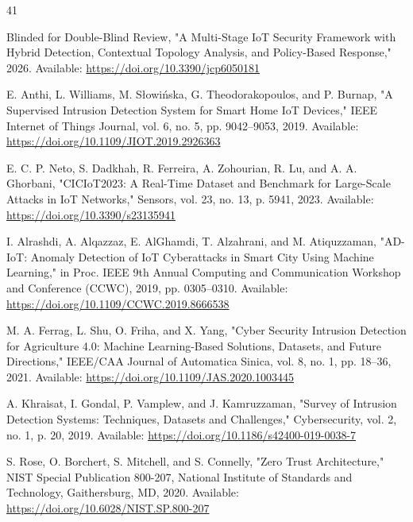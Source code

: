 \documentclass[journal,10pt,onecolumn]{IEEEtran}
\begin{document}
\appendix













\begin{thebibliography}{41}


 Blinded for Double-Blind Review, "A Multi-Stage IoT Security Framework with Hybrid Detection, Contextual Topology Analysis, and Policy-Based Response," 2026. Available: \url{https://doi.org/10.3390/jcp6050181}

 E. Anthi, L. Williams, M. Słowińska, G. Theodorakopoulos, and P. Burnap, "A Supervised Intrusion Detection System for Smart Home IoT Devices," IEEE Internet of Things Journal, vol. 6, no. 5, pp. 9042–9053, 2019. Available: \url{https://doi.org/10.1109/JIOT.2019.2926363}

 E. C. P. Neto, S. Dadkhah, R. Ferreira, A. Zohourian, R. Lu, and A. A. Ghorbani, "CICIoT2023: A Real-Time Dataset and Benchmark for Large-Scale Attacks in IoT Networks," Sensors, vol. 23, no. 13, p. 5941, 2023. Available: \url{https://doi.org/10.3390/s23135941}

 I. Alrashdi, A. Alqazzaz, E. AlGhamdi, T. Alzahrani, and M. Atiquzzaman, "AD-IoT: Anomaly Detection of IoT Cyberattacks in Smart City Using Machine Learning," in Proc. IEEE 9th Annual Computing and Communication Workshop and Conference (CCWC), 2019, pp. 0305–0310. Available: \url{https://doi.org/10.1109/CCWC.2019.8666538}

 M. A. Ferrag, L. Shu, O. Friha, and X. Yang, "Cyber Security Intrusion Detection for Agriculture 4.0: Machine Learning-Based Solutions, Datasets, and Future Directions," IEEE/CAA Journal of Automatica Sinica, vol. 8, no. 1, pp. 18–36, 2021. Available: \url{https://doi.org/10.1109/JAS.2020.1003445}

 A. Khraisat, I. Gondal, P. Vamplew, and J. Kamruzzaman, "Survey of Intrusion Detection Systems: Techniques, Datasets and Challenges," Cybersecurity, vol. 2, no. 1, p. 20, 2019. Available: \url{https://doi.org/10.1186/s42400-019-0038-7}

 S. Rose, O. Borchert, S. Mitchell, and S. Connelly, "Zero Trust Architecture," NIST Special Publication 800-207, National Institute of Standards and Technology, Gaithersburg, MD, 2020. Available: \url{https://doi.org/10.6028/NIST.SP.800-207}


\end{thebibliography}
\end{document}
